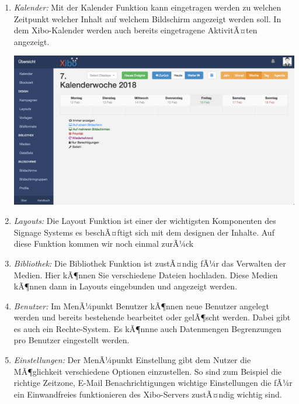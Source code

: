 \begin{enumerate}
	\item {\em Kalender:} Mit der Kalender Funktion kann eingetragen werden zu welchen Zeitpunkt welcher Inhalt auf welchem Bildschirm angezeigt werden soll. In dem Xibo-Kalender werden auch bereits eingetragene AktivitÃ¤ten angezeigt.

\begin{calendar}
	\centering
\includegraphics[width=1\textwidth]{images/xibo-basics-calendar}
	\label{Calendar}
\end{calendar}	
	
	\item {\em Layouts:} 
	Die Layout Funktion ist einer der wichtigsten Komponenten des Signage Systems es beschÃ¤ftigt sich mit dem designen der Inhalte. Auf diese Funktion kommen wir noch einmal zurÃ¼ck
	
	\item {\em Bibliothek:} 
	Die Bibliothek Funktion ist zustÃ¤ndig fÃ¼r das Verwalten der Medien. Hier kÃ¶nnen Sie verschiedene Dateien hochladen.  Diese Medien kÃ¶nnen dann in Layouts eingebunden und angezeigt werden.
	
	\item {\em Benutzer:} 
	Im MenÃ¼punkt Benutzer kÃ¶nnen neue Benutzer angelegt werden und bereits bestehende bearbeitet oder gelÃ¶scht werden. Dabei gibt es auch ein Rechte-System. Es kÃ¶nnne auch Datenmengen Begrenzungen pro Benutzer eingestellt werden.
	
	\item {\em Einstellungen:} 
	Der MenÃ¼punkt Einstellung gibt dem Nutzer die MÃ¶glichkeit verschiedene Optionen einzustellen. So sind zum Beispiel die richtige Zeitzone, E-Mail Benachrichtigungen wichtige Einstellungen die fÃ¼r ein Einwandfreies funktionieren des Xibo-Servers zustÃ¤ndig wichtig sind.
\end{enumerate}

